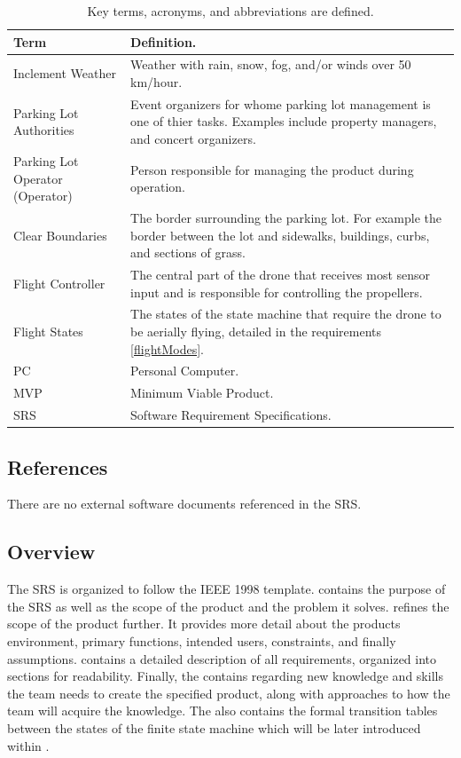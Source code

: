 \documentclass{article}
\begin{document}
\begin{table}[!h]
\begin{center}
\caption {Key terms, acronyms, and abbreviations are defined.} 
\label{DefTable}
\begin{tabular}{ | m{3cm} | m{11cm} | }
\hline
Term & Definition. \\
\hline
Inclement Weather & Weather with rain, snow, fog, and/or winds over 50 km/hour. \\
\hline
Parking Lot Authorities & Event organizers for whome parking lot management is one of thier tasks. Examples include property managers, and concert organizers.  \\
\hline
Parking Lot Operator (Operator) & Person responsible for managing the product during operation. \\
\hline
Clear Boundaries & The border surrounding the parking lot. For example the border between the lot and sidewalks, buildings, curbs, and sections of grass.\\
\hline
Flight Controller & The central part of the drone that receives most sensor input and is responsible for controlling the propellers.\\
\hline
Flight States & The states of the state machine that require the drone to be aerially flying, detailed in the requirements \ref{flightModes}.\\
\hline
PC & Personal Computer. \\
\hline
MVP & Minimum Viable Product. \\
\hline
SRS & Software Requirement Specifications. \\
\hline
\end{tabular}
\end{center}
\end{table}

\subsection{References}
There are no external software documents referenced in the SRS. 

\subsection{Overview}
The SRS is organized to follow the IEEE 1998 template.  contains the purpose of the SRS as well as the scope of the product and the problem it solves.   refines the scope of the product further. It provides more detail about the products environment, primary functions, intended users, constraints, and finally assumptions.  contains a detailed description of all requirements, organized into sections for readability. Finally, the  contains  regarding new knowledge and skills the team needs to create the specified product, along with approaches to how the team will acquire the knowledge. The   also contains the formal transition tables between the states of the finite state machine which will be later introduced within .
\end{document}
